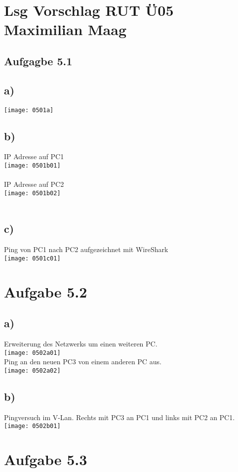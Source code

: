 \documentclass{article}
\begin{document}
	
	\section*{Lsg Vorschlag RUT Ü05 Maximilian Maag}
	\subsection*{Aufgagbe 5.1}
	\subsection*{a)}
	\texttt{[image: 0501a]}
	\subsection*{b)}
	IP Adresse auf PC1 \\
	\texttt{[image: 0501b01]} \\ \\
	IP Adresse auf PC2 \\
	\texttt{[image: 0501b02]} \\ \\
	\subsection*{c)}
	Ping von PC1 nach PC2 aufgezeichnet mit WireShark \\
	\texttt{[image: 0501c01]}
	\section*{Aufgabe 5.2}
	\subsection*{a)}
	Erweiterung des Netzwerks um einen weiteren PC. \\
	\texttt{[image: 0502a01]} \\
	Ping an den neuen PC3 von einem anderen PC aus. \\
	\texttt{[image: 0502a02]}
	\subsection*{b)}
	Pingversuch im V-Lan. Rechts mit PC3 an PC1 und links mit PC2 an PC1. \\
	\texttt{[image: 0502b01]}
	\section*{Aufgabe 5.3}
\end{document}
